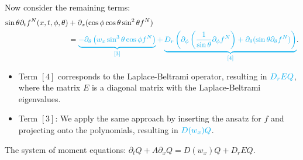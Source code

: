 \begin{frame}
		\scriptsize
Now consider the remaining terms:
	\begin{align*}
		\sin\theta \partial_{t}f^N(x,t,\phi,\theta) &+ \partial_x (\cos\phi \cos\theta \sin^2\theta f^N) \\
		&= \textcolor{cyan}{\underbrace{-\partial_\theta \left(w_x \sin^3 \theta \cos \phi f^N\right)}_{[3]} + \underbrace{D_{r} \left(\partial_\phi \left(\frac{1}{\sin \theta} \partial_\phi f^N \right) + \partial_\theta (\sin \theta \partial_\theta f^N) \right)}_{[4]}}.
	\end{align*}
\pause
\begin{itemize}
	\item Term $[4]$ corresponds to the Laplace-Beltrami operator,  resulting in $\textcolor{cyan}{D_r E Q}$, where the matrix $E$ is a diagonal matrix with the Laplace-Beltrami eigenvalues. 
	\pause
	\item Term $[3]$: We apply the same approach by inserting the ansatz for $f$ and projecting onto the polynomials, resulting in $\textcolor{cyan}{D(w_x)Q}$.
\end{itemize}
\vspace{5mm}
The system of moment equations:
$\partial_t Q + A\partial_x Q =  D(w_x)Q+ D_rEQ$. 
\end{frame}


